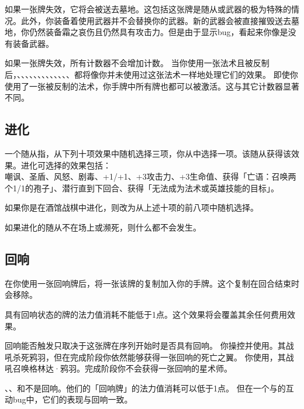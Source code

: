 如果一张牌失效，它将会被送去墓地。这包括这张牌是随从或武器的极为特殊的情况。此外，你装备着使用武器并不会替换你的武器。新的武器会被直接摧毁送去墓地，你仍然装备霜之哀伤且仍然具有攻击力。但是由于显示bug，看起来你像是没有装备武器。

如果一张牌失效，所有计数器不会增加计数。
\example 当你使用一张法术且被反制后，、、、、、、、、、、、、、都将像你并未使用过这张法术一样地处理它们的效果。
\exception 即使你使用了一张被反制的法术，你手牌中所有牌也都可以被激活。这与其它计数器显著不同。

\subsection{进化}
\label{adapt}

一个随从指，从下列十项效果中随机选择三项，你从中选择一项。该随从获得该效果。进化可选择的效果包括：\\
嘲讽、圣盾、风怒、剧毒、+1/+1、+3攻击力、+3生命值、获得「亡语：召唤两个1/1的孢子」、潜行直到下回合、获得「无法成为法术或英雄技能的目标」。

如果你是在酒馆战棋中进化，则改为从上述十项的前八项中随机选择。

如果进化的随从不在场上或濒死，则什么都不会发生。

\subsection{回响}
\label{echo}

在你使用一张回响牌后，将一张该牌的复制加入你的手牌。这个复制在回合结束时会移除。

具有回响状态的牌的法力值消耗不能低于1点。这个效果将会覆盖其余任何费用效果。

回响能否触发只取决于这张牌在序列开始时是否具有回响。
\example 你操控并使用。其战吼杀死鸦羽，但在完成阶段你依然能够获得一张回响的死亡之翼。
\example 你使用，其战吼召唤格林达·鸦羽。完成阶段你不会获得一张回响的星术师。

、、和不是回响。他们的「回响牌」的法力值消耗可以低于1点。
\notice 但在一个与的互动bug中，它们的表现与回响一致。


